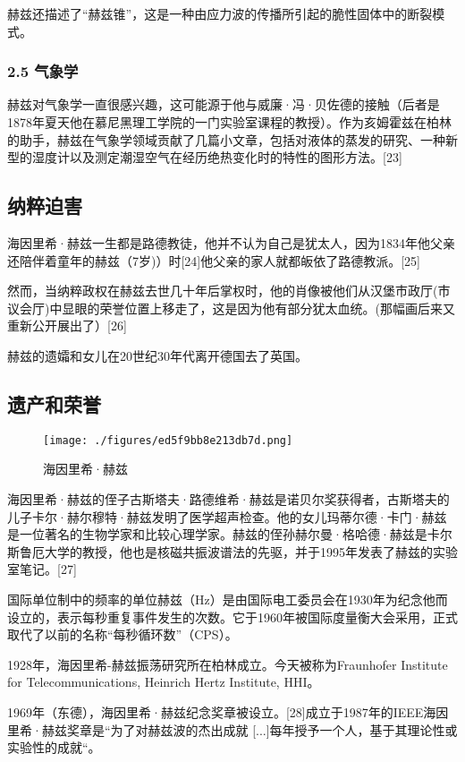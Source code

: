 赫兹还描述了“赫兹锥”，这是一种由应力波的传播所引起的脆性固体中的断裂模式。

\subsubsection{2.5 气象学}
赫兹对气象学一直很感兴趣，这可能源于他与威廉·冯·贝佐德的接触（后者是1878年夏天他在慕尼黑理工学院的一门实验室课程的教授）。作为亥姆霍兹在柏林的助手，赫兹在气象学领域贡献了几篇小文章，包括对液体的蒸发的研究、一种新型的湿度计以及测定潮湿空气在经历绝热变化时的特性的图形方法。[23]

\subsection{纳粹迫害}
海因里希·赫兹一生都是路德教徒，他并不认为自己是犹太人，因为1834年他父亲还陪伴着童年的赫兹（7岁)）时[24]他父亲的家人就都皈依了路德教派。[25]

然而，当纳粹政权在赫兹去世几十年后掌权时，他的肖像被他们从汉堡市政厅(市议会厅)中显眼的荣誉位置上移走了，这是因为他有部分犹太血统。(那幅画后来又重新公开展出了）[26]

赫兹的遗孀和女儿在20世纪30年代离开德国去了英国。

\subsection{遗产和荣誉}
\begin{figure}[ht]
\centering
\texttt{[image: ./figures/ed5f9bb8e213db7d.png]}
\caption{海因里希·赫兹} \label{fig_Hertz_10}
\end{figure}
海因里希·赫兹的侄子古斯塔夫·路德维希·赫兹是诺贝尔奖获得者，古斯塔夫的儿子卡尔·赫尔穆特·赫兹发明了医学超声检查。他的女儿玛蒂尔德·卡门·赫兹是一位著名的生物学家和比较心理学家。赫兹的侄孙赫尔曼·格哈德·赫兹是卡尔斯鲁厄大学的教授，他也是核磁共振波谱法的先驱，并于1995年发表了赫兹的实验室笔记。[27]

国际单位制中的频率的单位赫兹（Hz）是由国际电工委员会在1930年为纪念他而设立的，表示每秒重复事件发生的次数。它于1960年被国际度量衡大会采用，正式取代了以前的名称“每秒循环数”（CPS）。

1928年，海因里希-赫兹振荡研究所在柏林成立。今天被称为Fraunhofer Institute for Telecommunications, Heinrich Hertz Institute, HHI。

1969年（东德），海因里希·赫兹纪念奖章被设立。[28]成立于1987年的IEEE海因里希·赫兹奖章是“为了对赫兹波的杰出成就 [...]每年授予一个人，基于其理论性或实验性的成就“。

